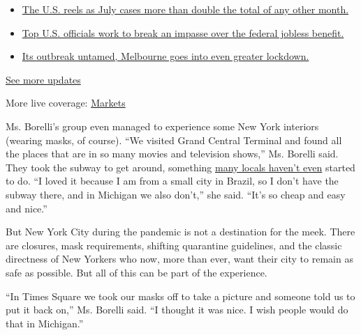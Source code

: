 \begin{itemize}
\tightlist
\item
  \href{https://www.nytimes.com/2020/08/01/world/coronavirus-covid-19.html?action=click\&pgtype=Article\&state=default\&region=MAIN_CONTENT_1\&context=storylines_live_updates\#link-34047410}{The
  U.S. reels as July cases more than double the total of any other
  month.}
\item
  \href{https://www.nytimes.com/2020/08/01/world/coronavirus-covid-19.html?action=click\&pgtype=Article\&state=default\&region=MAIN_CONTENT_1\&context=storylines_live_updates\#link-780ec966}{Top
  U.S. officials work to break an impasse over the federal jobless
  benefit.}
\item
  \href{https://www.nytimes.com/2020/08/01/world/coronavirus-covid-19.html?action=click\&pgtype=Article\&state=default\&region=MAIN_CONTENT_1\&context=storylines_live_updates\#link-2bc8948}{Its
  outbreak untamed, Melbourne goes into even greater lockdown.}
\end{itemize}

\href{https://www.nytimes.com/2020/08/01/world/coronavirus-covid-19.html?action=click\&pgtype=Article\&state=default\&region=MAIN_CONTENT_1\&context=storylines_live_updates}{See
more updates}

More live coverage:
\href{https://www.nytimes.com/live/2020/07/31/business/stock-market-today-coronavirus?action=click\&pgtype=Article\&state=default\&region=MAIN_CONTENT_1\&context=storylines_live_updates}{Markets}

Ms. Borelli's group even managed to experience some New York interiors
(wearing masks, of course). ``We visited Grand Central Terminal and
found all the places that are in so many movies and television shows,''
Ms. Borelli said. They took the subway to get around, something
\href{https://www.nytimes.com/2020/07/17/nyregion/coronavirus-subways-spread-nyc.html}{many
locals haven't even} started to do. ``I loved it because I am from a
small city in Brazil, so I don't have the subway there, and in Michigan
we also don't,'' she said. ``It's so cheap and easy and nice.''

But New York City during the pandemic is not a destination for the meek.
There are closures, mask requirements, shifting quarantine guidelines,
and the classic directness of New Yorkers who now, more than ever, want
their city to remain as safe as possible. But all of this can be part of
the experience.

``In Times Square we took our masks off to take a picture and someone
told us to put it back on,'' Ms. Borelli said. ``I thought it was nice.
I wish people would do that in Michigan.''

